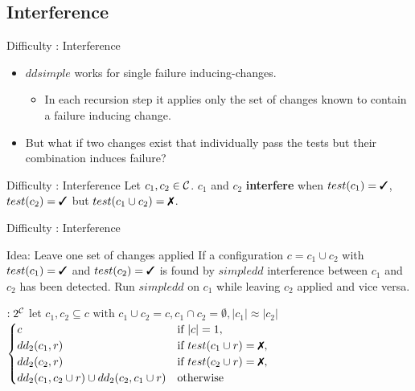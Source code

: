 \subsection{Interference}
\begin{frame}{Difficulty : Interference}
	\begin{itemize}
		\item $ddsimple$ works for single failure inducing-changes.
			\begin{itemize}
				\item In each recursion step it applies only the set of changes known to contain a failure inducing change.
			\end{itemize}
		\item But what if two changes exist that individually pass the tests but their combination induces failure?
	\end{itemize}

	\begin{alertblock}{Difficulty : Interference}
		Let $c_1,c_2 \in \mathcal{C}$. $c_1$ and $c_2$ \textbf{interfere} when $test(c_1)=\cmark$, $test(c_2)=\cmark$ but $test(c_1\cup c_2) = \xmark$.
	\end{alertblock}

\end{frame}

\begin{frame}{Difficulty : Interference}
	\begin{exampleblock}{Idea: Leave one set of changes applied}
		If a configuration $c = c_1 \cup c_2$ with $test(c_1)=\cmark$ and $test(c_2)=\cmark$ is found by $simpledd$ interference between $c_1$ and $c_2$ has been detected. Run $simpledd$ on $c_1$ while leaving $c_2$ applied and vice versa.
	\end{exampleblock}

	\bigskip


	\begin{algorithmic}[1]
		 $: 2^{\mathcal{C}}$
		\State let $c_1,c_2 \subseteq c \text{ with } c_1 \cup c_2 = c, c_1 \cap c_2 = \emptyset, |c_1| \approx |c_2|$
		\State \Return $ \begin{cases}
				c & \text{if } |c|=1, \\
				dd_2(c_1,r) & \text{if } test(c_1 \cup r) = \xmark,\\
				dd_2(c_2,r) & \text{if } test(c_2 \cup r) = \xmark, \\
				dd_2(c_1, c_2 \cup r) \cup dd_2(c_2, c_1 \cup r) & \text{otherwise} 
			\end{cases}$
		\EndFunction
	\end{algorithmic}

\end{frame}

